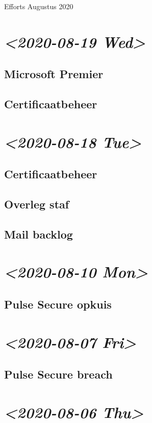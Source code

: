 \documentclass[11pt]{article}
\begin{document}
Efforts Augustus 2020
\section{\textit{<2020-08-19 Wed>}}
\label{sec:org74befec}
\subsection{Microsoft Premier}
\label{sec:orga625102}
\subsection{Certificaatbeheer}
\label{sec:orgfabe8d0}
\section{\textit{<2020-08-18 Tue>}}
\label{sec:org47ae2a8}
\subsection{Certificaatbeheer}
\label{sec:orgaf6373e}
\subsection{Overleg staf}
\label{sec:org2afd546}
\subsection{Mail backlog}
\label{sec:org3f4bf2a}
\section{\textit{<2020-08-10 Mon>}}
\label{sec:org8849d95}
\subsection{Pulse Secure opkuis}
\label{sec:org786aa49}
\section{\textit{<2020-08-07 Fri>}}
\label{sec:orgf2f3240}
\subsection{Pulse Secure breach}
\label{sec:org3732000}
\section{\textit{<2020-08-06 Thu>}}
\label{sec:org4ccc4bc}
\end{document}
